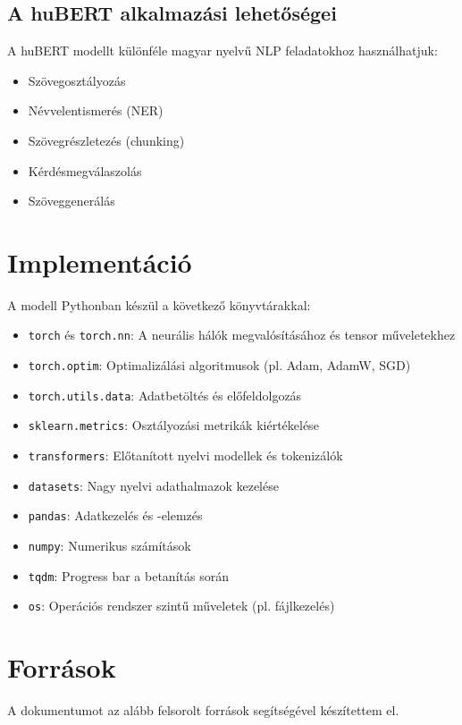 \documentclass[12pt]{article}
\begin{document}
\subsection{A huBERT alkalmazási lehetőségei}
A huBERT modellt különféle magyar nyelvű NLP feladatokhoz használhatjuk:
\begin{itemize}
    \item Szövegosztályozás
    \item Névvelentismerés (NER)
    \item Szövegrészletezés (chunking)
    \item Kérdésmegválaszolás
    \item Szöveggenerálás
\end{itemize}

\section{Implementáció}
A modell Pythonban készül a következő könyvtárakkal:

\begin{itemize}
    \item \texttt{torch} és \texttt{torch.nn}: A neurális hálók megvalósításához és tensor műveletekhez
    \item \texttt{torch.optim}: Optimalizálási algoritmusok (pl. Adam, AdamW, SGD)
    \item \texttt{torch.utils.data}: Adatbetöltés és előfeldolgozás
    \item \texttt{sklearn.metrics}: Osztályozási metrikák kiértékelése
    \item \texttt{transformers}: Előtanított nyelvi modellek és tokenizálók
    \item \texttt{datasets}: Nagy nyelvi adathalmazok kezelése
    \item \texttt{pandas}: Adatkezelés és -elemzés
    \item \texttt{numpy}: Numerikus számítások
    \item \texttt{tqdm}: Progress bar a betanítás során
    \item \texttt{os}: Operációs rendszer szintű műveletek (pl. fájlkezelés)
\end{itemize}

\section{Források}

A dokumentumot az alább felsorolt források segítségével készítettem el.
\end{document}
